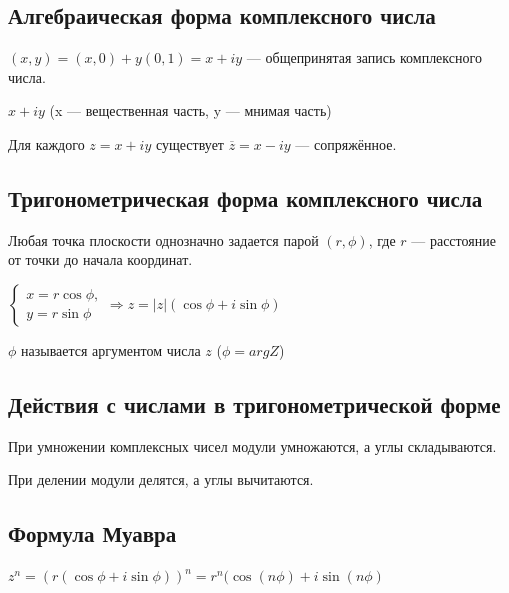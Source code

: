 \documentclass[a4paper]{article}
\begin{document}
    \subsection*{Алгебраическая форма комплексного числа}
    $(x,y) = (x,0) + y(0,1) = x+iy$ --- общепринятая запись комплексного числа.

    $x+iy$ (x --- вещественная часть, y --- мнимая часть)

    Для каждого $z = x+iy$ существует $\overline{z} = x-iy$ --- сопряжённое.

    \newpage \begin{center}
                 \begin{Large}
                 \end{Large}
    \end{center}
    \subsection*{Тригонометрическая форма комплексного числа}

    Любая точка плоскости однозначно задается парой $(r, \phi)$, где $r$ --- расстояние от точки до начала координат.

    $\displaystyle \begin{cases}
                       x = r \cos \phi,
                       \\
                       y = r \sin \phi
    \end{cases} \Rightarrow z = |z| (\cos \phi + i \sin \phi)$

    $\phi$ называется аргументом числа $z$ ($\phi = argZ$)

    \subsection*{Действия с числами в тригонометрической форме}

    При умножении комплексных чисел модули умножаются, а углы складываются.

    При делении модули делятся, а углы вычитаются.



    \subsection*{Формула Муавра}
    $z^n = (r(\cos \phi + i \sin \phi))^n = r^n ( \cos(n \phi) + i \sin(n \phi)$

    \newpage \begin{center}
                 \begin{Large}
                 \end{Large}
    \end{center}
\end{document}
